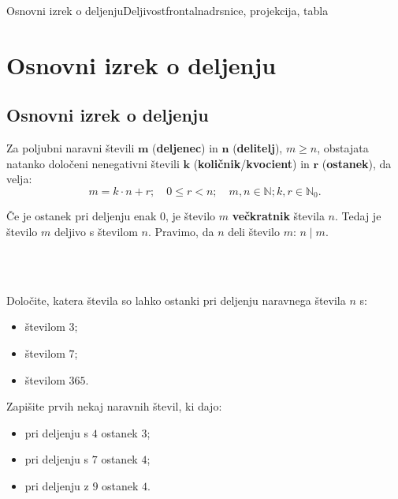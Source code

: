 \begin{priprava}{4}{}{Osnovni izrek o deljenju}{Deljivost}{frontalna}{drsnice, projekcija, tabla}


    \section{Osnovni izrek o deljenju}

        

    \subsection*{Osnovni izrek o deljenju}
        Za poljubni naravni števili $\mathbf{m}$ (\textbf{deljenec}) in $\mathbf{n}$ (\textbf{delitelj}), $m\geq n$, 
        obstajata natanko določeni nenegativni števili $\mathbf{k}$ (\textbf{količnik}/\textbf{kvocient}) in $\mathbf{r}$ (\textbf{ostanek}), 
        da velja:
        $$m=k\cdot n+r; \quad  0\leq r<n; \quad m,n\in\mathbb{N}; k,r\in\mathbb{N}_0.$$
    

    
        Če je ostanek pri deljenju enak $0$, je število $m$ \textbf{večkratnik} števila $n$. 
        Tedaj je število $m$ deljivo s številom $n$. Pravimo, da $n$ deli število $m$: $n\mid m$.

~\\~

    \begin{naloga}
        Določite, katera števila so lahko ostanki pri deljenju naravnega števila $n$ s:
        \begin{itemize}
            \item številom $3$; 
            \item številom $7$; 
            \item številom $365$. 
        \end{itemize}
    \end{naloga}

    \begin{naloga}
        Zapišite prvih nekaj naravnih števil, ki dajo:
        \begin{itemize}
            \item pri deljenju s $4$ ostanek $3$; 
            \item pri deljenju s $7$ ostanek $4$; 
            \item pri deljenju z $9$ ostanek $4$. 
        \end{itemize}
    \end{naloga}


\end{priprava}
